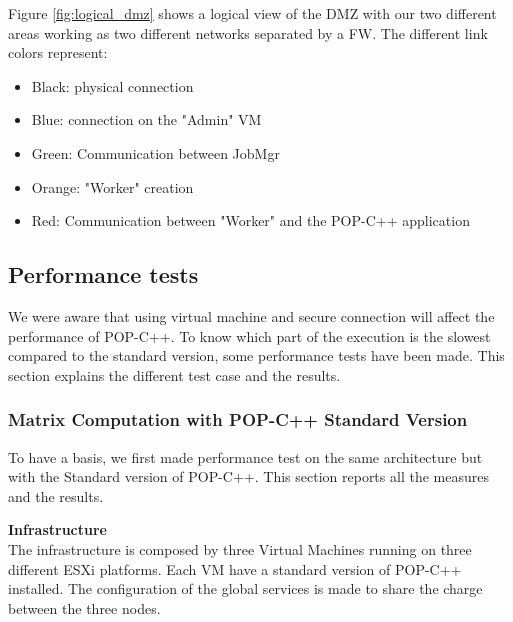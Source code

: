 Figure \ref{fig:logical_dmz} shows a logical view of the DMZ with our two different areas working as two different networks separated by a FW. The different link colors represent: 

\begin{itemize}
\item Black: physical connection
\item Blue: connection on the "Admin" VM
\item Green: Communication between JobMgr
\item Orange: "Worker" creation
\item Red: Communication between "Worker" and the POP-C++ application
\end{itemize}

%
%
\subsection{Performance tests}
We were aware that using virtual machine and secure connection will affect the performance of POP-C++. To know which part of the execution is the slowest compared to the standard version, some performance tests have been made. This section explains the different test case and the results.

\subsubsection{Matrix Computation with POP-C++ Standard Version}
To have a basis, we first made performance test on the same architecture but with the Standard version of POP-C++. This section reports all the measures and the results. \s

\textbf{Infrastructure}\\
The infrastructure is composed by three Virtual Machines running on three different ESXi platforms. Each VM have a standard version of POP-C++ installed. The configuration of the global services is made to share the charge between the three nodes. \s

